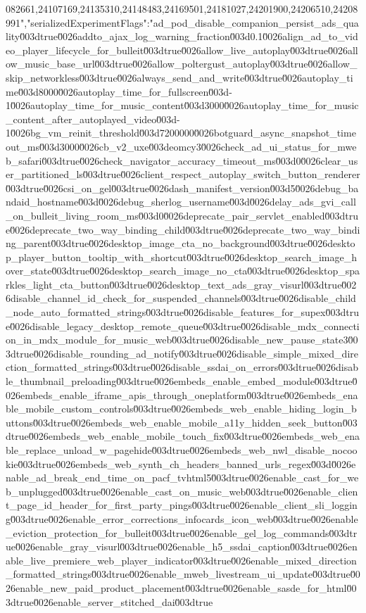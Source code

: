{082661,24107169,24135310,24148483,24169501,24181027,24201900,24206510,24208991","serializedExperimentFlags":"ad_pod_disable_companion_persist_ads_quality\u003dtrue\u0026addto_ajax_log_warning_fraction\u003d0.1\u0026align_ad_to_video_player_lifecycle_for_bulleit\u003dtrue\u0026allow_live_autoplay\u003dtrue\u0026allow_music_base_url\u003dtrue\u0026allow_poltergust_autoplay\u003dtrue\u0026allow_skip_networkless\u003dtrue\u0026always_send_and_write\u003dtrue\u0026autoplay_time\u003d8000\u0026autoplay_time_for_fullscreen\u003d-1\u0026autoplay_time_for_music_content\u003d3000\u0026autoplay_time_for_music_content_after_autoplayed_video\u003d-1\u0026bg_vm_reinit_threshold\u003d7200000\u0026botguard_async_snapshot_timeout_ms\u003d3000\u0026cb_v2_uxe\u003deomcy3\u0026check_ad_ui_status_for_mweb_safari\u003dtrue\u0026check_navigator_accuracy_timeout_ms\u003d0\u0026clear_user_partitioned_ls\u003dtrue\u0026client_respect_autoplay_switch_button_renderer\u003dtrue\u0026csi_on_gel\u003dtrue\u0026dash_manifest_version\u003d5\u0026debug_bandaid_hostname\u003d\u0026debug_sherlog_username\u003d\u0026delay_ads_gvi_call_on_bulleit_living_room_ms\u003d0\u0026deprecate_pair_servlet_enabled\u003dtrue\u0026deprecate_two_way_binding_child\u003dtrue\u0026deprecate_two_way_binding_parent\u003dtrue\u0026desktop_image_cta_no_background\u003dtrue\u0026desktop_player_button_tooltip_with_shortcut\u003dtrue\u0026desktop_search_image_hover_state\u003dtrue\u0026desktop_search_image_no_cta\u003dtrue\u0026desktop_sparkles_light_cta_button\u003dtrue\u0026desktop_text_ads_gray_visurl\u003dtrue\u0026disable_channel_id_check_for_suspended_channels\u003dtrue\u0026disable_child_node_auto_formatted_strings\u003dtrue\u0026disable_features_for_supex\u003dtrue\u0026disable_legacy_desktop_remote_queue\u003dtrue\u0026disable_mdx_connection_in_mdx_module_for_music_web\u003dtrue\u0026disable_new_pause_state3\u003dtrue\u0026disable_rounding_ad_notify\u003dtrue\u0026disable_simple_mixed_direction_formatted_strings\u003dtrue\u0026disable_ssdai_on_errors\u003dtrue\u0026disable_thumbnail_preloading\u003dtrue\u0026embeds_enable_embed_module\u003dtrue\u0026embeds_enable_iframe_apis_through_oneplatform\u003dtrue\u0026embeds_enable_mobile_custom_controls\u003dtrue\u0026embeds_web_enable_hiding_login_buttons\u003dtrue\u0026embeds_web_enable_mobile_a11y_hidden_seek_button\u003dtrue\u0026embeds_web_enable_mobile_touch_fix\u003dtrue\u0026embeds_web_enable_replace_unload_w_pagehide\u003dtrue\u0026embeds_web_nwl_disable_nocookie\u003dtrue\u0026embeds_web_synth_ch_headers_banned_urls_regex\u003d\u0026enable_ad_break_end_time_on_pacf_tvhtml5\u003dtrue\u0026enable_cast_for_web_unplugged\u003dtrue\u0026enable_cast_on_music_web\u003dtrue\u0026enable_client_page_id_header_for_first_party_pings\u003dtrue\u0026enable_client_sli_logging\u003dtrue\u0026enable_error_corrections_infocards_icon_web\u003dtrue\u0026enable_eviction_protection_for_bulleit\u003dtrue\u0026enable_gel_log_commands\u003dtrue\u0026enable_gray_visurl\u003dtrue\u0026enable_h5_ssdai_caption\u003dtrue\u0026enable_live_premiere_web_player_indicator\u003dtrue\u0026enable_mixed_direction_formatted_strings\u003dtrue\u0026enable_mweb_livestream_ui_update\u003dtrue\u0026enable_new_paid_product_placement\u003dtrue\u0026enable_sasde_for_html\u003dtrue\u0026enable_server_stitched_dai\u003dtrue}
